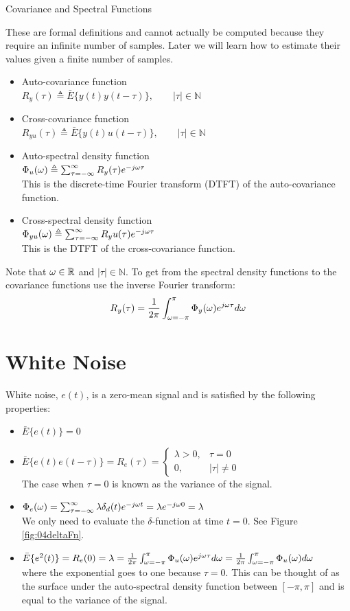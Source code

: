 \begin{definition}{Covariance and Spectral Functions}

These are formal definitions and cannot actually be computed because they require an infinite number of samples. Later we will learn how to estimate their values given a finite number of samples.
\begin{itemize}
\item Auto-covariance function \\
$R_y(\tau) \triangleq \bar{E}\{y(t)y(t-\tau)\}, \qquad |\tau|\in\mathbb{N}$
\item Cross-covariance function \\
$R_{yu}(\tau) \triangleq \bar{E}\{y(t)u(t-\tau)\}, \qquad |\tau|\in\mathbb{N}$
\item Auto-spectral density function \\
$\Phi_u(\omega) \triangleq \sum_{\tau=-\infty}^\infty R_y(\tau)e^{-j\omega\tau}$ \\
This is the discrete-time Fourier transform (DTFT) of the auto-covariance function.
\item Cross-spectral density function \\
$\Phi_{yu}(\omega) \triangleq \sum_{\tau=-\infty}^\infty R_yu(\tau)e^{-j\omega\tau}$ \\
This is the DTFT of the cross-covariance function.
\end{itemize}
Note that $\omega\in\mathbb{R}$ and $|\tau|\in\mathbb{N}$. To get from the spectral density functions to the covariance functions use the inverse Fourier transform:
$$R_y(\tau) = \frac{1}{2\pi}\int_{\omega=-\pi}^\pi \Phi_y(\omega)e^{j\omega\tau}d\omega$$
\end{definition}

\section{White Noise}
White noise, $e(t)$, is a zero-mean signal and is satisfied by the following properties:
\begin{itemize}
\item $\bar{E}\{e(t)\}=0$
\item $\bar{E}\{e(t)e(t-\tau)\} = R_e(\tau) = \begin{cases} \lambda>0, & \tau=0 \\ 0, & |\tau|\neq 0 \end{cases}$ \\
The case when $\tau=0$ is known as the variance of the signal.
\item $\Phi_e(\omega) = \sum_{\tau=-\infty}^\infty \lambda\delta_d(t)e^{-j\omega t} = \lambda e^{-j\omega 0} = \lambda$ \\
We only need to evaluate the $\delta$-function at time $t=0$. See Figure \ref{fig:04deltaFn}.
\item $\bar{E}\{e^2(t)\} = R_e(0) = \lambda = \frac{1}{2\pi}\int_{\omega=-\pi}^\pi\Phi_u(\omega)e^{j\omega\tau}d\omega = \frac{1}{2\pi} \int_{\omega=-\pi}^\pi\Phi_u(\omega)d\omega$ \\
where the exponential goes to one because $\tau=0$. This can be thought of as the surface under the auto-spectral density function between $[-\pi,\pi]$ and is equal to the variance of the signal.
\end{itemize}

